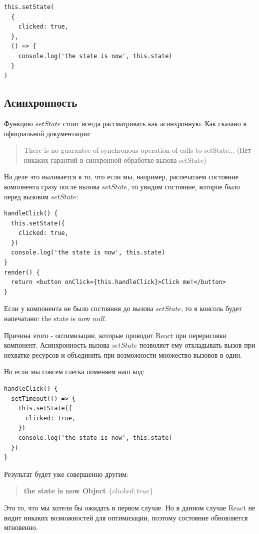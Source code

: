 \begin{lstlisting}
this.setState(
  {
    clicked: true,
  }, 
  () => {
    console.log('the state is now', this.state)
  }
)
\end{lstlisting}

\subsection{Асинхронность}

Функцию $setState$ стоит всегда рассматривать как асинхронную. 
Как сказано в официальной документации:

\begin{quotation}
There is no guarantee of synchronous operation of calls to setState... (Нет никаких гарантий в синхронной обработке вызова setState)
\end{quotation}

На деле это выливается в то, что если мы, например, распечатаем состояние компонента сразу после вызова $setState$, то увидим состояние, которое было перед вызовом $setState$:

\begin{lstlisting}
handleClick() {
  this.setState({
    clicked: true,
  })
  console.log('the state is now', this.state)
}
render() {
  return <button onClick={this.handleClick}>Click me!</button>
}
\end{lstlisting}

Если у компонента не было состояния до вызова $setState$, то в консоль будет напечатано: the state is now $null$.

Причина этого - оптимизации, которые проводит React при перерисовки компонент. Асинхронность вызова $setState$ позволяет ему откладывать вызов при нехватке ресурсов и объединять при возможности множество вызовов в один.

Но если мы совсем слегка поменяем наш код:

\begin{lstlisting}
handleClick() {
  setTimeout(() => {
    this.setState({
      clicked: true,
    })
    console.log('the state is now', this.state)
  })
}
\end{lstlisting}

Результат будет уже совершенно другим:

\begin{quotation}
	\textbf{the state is now Object $\{clicked: true\}$}
\end{quotation}

Это то, что мы хотели бы ожидать в первом случае. 
Но в данном случае React не видит никаких возможностей для оптимизации, поэтому состояние обновляется мгновенно.


